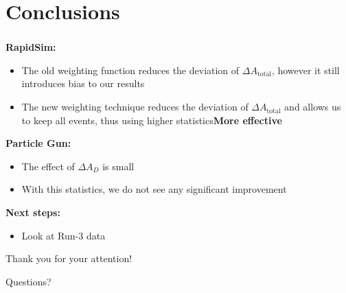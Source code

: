 \documentclass{beamer}
\begin{document}
\section{Conclusions}
\begin{frame}
      \frametitle{\insertsectionhead}
      \textbf{RapidSim:}
      \begin{itemize}
            \item The old weighting function reduces the deviation of $\Delta A_\text{total}$, however it still introduces bias to our results
            \item The new weighting technique reduces the deviation of $\Delta A_\text{total}$ and allows us to keep all events, thus using higher statistics\Rightarrow \textbf{More effective}
      \end{itemize}
      \bigbreak
      \textbf{Particle Gun:}
      \begin{itemize}
            \item The effect of $\Delta A_D$ is small
            \item With this statistics, we do not see any significant improvement
      \end{itemize}
      \bigbreak
      \textbf{Next steps:}
      \begin{itemize}
            \item Look at Run-3 data
      \end{itemize}
\end{frame}


\begin{frame}
      \LARGE
      \centering
      Thank you for your attention!

      Questions?
\end{frame}
\end{document}
